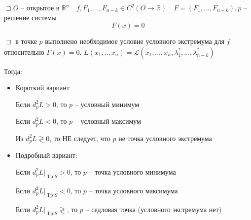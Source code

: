 \documentclass{book}
\newcommand\R{\ensuremath{\mathbb{R}}}
\theoremstyle{definition}
\DeclareMathOperator{\Tp}{Tp}
\begin{document}
   \begin{statement}

       $\sqsupset O$ -- открытое в $\R^n\quad f, F_1, \ldots, F_{n-k}\in C^2\left( O\to \R \right) \quad F = \left( F_1, \ldots, F_{n-k} \right) , p$ -- решение системы \[F(x) = 0\]

       $\sqsupset $ в точке $p$ выполнено необходимое условие условного экстремума для  $f$ относительно $F(x) = 0$.  $L\left( x_1, .., x_{n}  \right)  = \mathcal L\left( x_1, \ldots, x_{n}, \lambda_1^*, \ldots, \lambda_{n-k}^*  \right) $

       Тогда:
       \begin{itemize}
           \item  Короткий вариант

               Если  $d^2_pL >0 $, то $p$ -- условный минимум

               Если  $d^2_pL<0$, то  $p$ -- условный максимум

               Из $d^2_pL \gtrless 0$, то НЕ следует, что $p$ не точка условного экстремума
           \item Подробный вариант:

               Если $d^2_pL|_{\Tp S}>0$, то $p$ -- точка условного минимума

               Если  $d^2_pL|_{\Tp S}<0$, то $p$ -- точка условного максимума

               Если  $d^2_pL|_{\Tp S}\gtrless$, то $p$ -- седловая точка (условного экстремума нет)
       \end{itemize}
   \end{statement}
\end{document}
